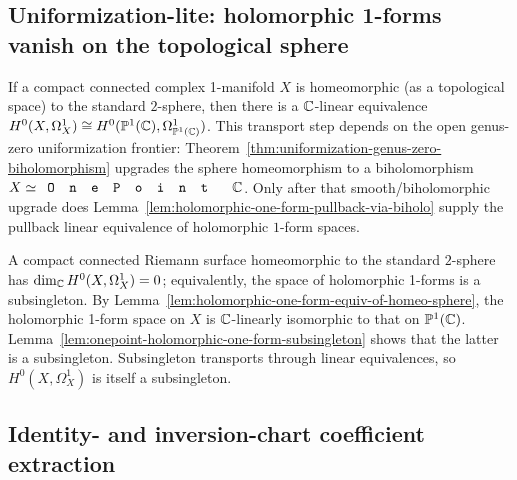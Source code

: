 \subsection{Uniformization-lite: holomorphic 1-forms vanish on the topological sphere}
\label{sec:uniformization-lite}

\begin{lemma}
\label{lem:holomorphic-one-form-equiv-of-homeo-sphere}
If a compact connected complex 1-manifold \(X\) is homeomorphic
(as a topological space) to the standard \(2\)-sphere, then there
is a \(\mathbb{C}\)-linear equivalence
\(H^{0}(X,\Omega^{1}_{X})\cong H^{0}(\mathbb{P}^{1}(\mathbb{C}),\Omega^{1}_{\mathbb{P}^{1}(\mathbb{C})})\).
This transport step depends on the open genus-zero uniformization frontier:
Theorem~\ref{thm:uniformization-genus-zero-biholomorphism} upgrades the
sphere homeomorphism to a biholomorphism \(X\simeq\code{OnePoint}\,\C\).
Only after that smooth/biholomorphic upgrade does
Lemma~\ref{lem:holomorphic-one-form-pullback-via-biholo} supply the pullback
linear equivalence of holomorphic \(1\)-form spaces.
\end{lemma}

\begin{theorem}
\label{thm:homeo-sphere-holomorphic-one-form-vanishing}
A compact connected Riemann surface homeomorphic to the standard
\(2\)-sphere has \(\dim_{\mathbb{C}}H^{0}(X,\Omega^{1}_{X})=0\); equivalently,
the space of holomorphic 1-forms is a subsingleton.
By Lemma~\ref{lem:holomorphic-one-form-equiv-of-homeo-sphere}, the
holomorphic 1-form space on \(X\) is \(\mathbb{C}\)-linearly isomorphic to
that on \(\mathbb{P}^{1}(\mathbb{C})\). Lemma~\ref{lem:onepoint-holomorphic-one-form-subsingleton}
shows that the latter is a subsingleton. Subsingleton transports through
linear equivalences, so \(H^{0}(X,\Omega^{1}_{X})\) is itself a subsingleton.
\end{theorem}

\subsection{Identity- and inversion-chart coefficient extraction}
\label{sec:chart-coeff-extraction}

